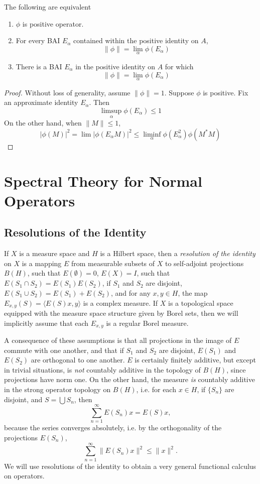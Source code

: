 \begin{theorem}
    The following are equivalent
    \begin{enumerate}
        \item $\phi$ is positive operator.
        \item For every BAI $E_\alpha$ contained within the positive identity on $A$,
        \[ \| \phi \| = \lim_\alpha \phi(E_\alpha) \]
        \item There is a BAI $E_\alpha$ in the positive identity on $A$ for which
        \[ \| \phi \| = \lim_\alpha \phi(E_\alpha) \]
    \end{enumerate}
\end{theorem}
\begin{proof}
    Without loss of generality, assume $\| \phi \| = 1$. Suppose $\phi$ is positive. Fix an approximate identity $E_\alpha$. Then
    \[ \limsup_\alpha \phi(E_\alpha) \leq 1 \]
    On the other hand, when $\| M \| \leq 1$,
    \[ |\phi(M)|^2 = \lim |\phi(E_\alpha M)|^2 \leq \liminf_\alpha \phi(E_\alpha^2) \phi(M^*M) \]
\end{proof}







\chapter{Spectral Theory for Normal Operators}

\section{Resolutions of the Identity}

If $X$ is a measure space and $H$ is a Hilbert space, then a \emph{resolution of the identity} on $X$ is a mapping $E$ from measurable subsets of $X$ to self-adjoint projections $B(H)$, such that $E(\emptyset) = 0$, $E(X) = I$, such that $E(S_1 \cap S_2) = E(S_1) E(S_2)$, if $S_1$ and $S_2$ are disjoint, $E(S_1 \cup S_2) = E(S_1) + E(S_2)$, and for any $x,y \in H$, the map $E_{x,y}(S) = \langle E(S) x, y \rangle$ is a complex measure. If $X$ is a topological space equipped with the measure space structure given by Borel sets, then we will implicitly assume that each $E_{x,y}$ is a regular Borel measure.

A consequence of these assumptions is that all projections in the image of $E$ commute with one another, and that if $S_1$ and $S_2$ are disjoint, $E(S_1)$ and $E(S_2)$ are orthogonal to one another. $E$ is certainly finitely additive, but except in trivial situations, is \emph{not} countably additive in the topology of $B(H)$, since projections have norm one. On the other hand, the measure \emph{is} countably additive in the strong operator topology on $B(H)$, i.e. for each $x \in H$, if $\{ S_n \}$ are disjoint, and $S = \bigcup S_n$, then
%
\[ \sum_{n = 1}^\infty E(S_n) x = E(S) x, \]
%
because the series converges absolutely, i.e. by the orthogonality of the projections $E(S_n)$,
%
\[ \sum_{n = 1}^\infty \| E(S_n) x \|^2 \leq \| x \|^2. \]
%
We will use resolutions of the identity to obtain a very general functional calculus on operators.

